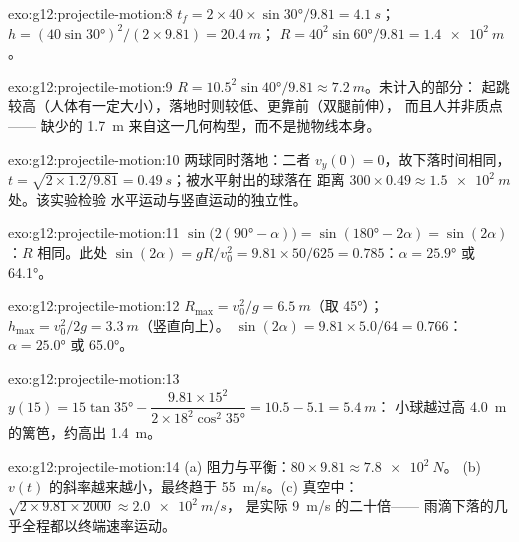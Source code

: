 \begin{solution}{exo:g12:projectile-motion:8}
$t_f = 2 \times 40 \times \sin\ang{30}/9.81 = \qty{4.1}{s}$；
$h = (40\sin\ang{30})^2/(2 \times 9.81) = \qty{20.4}{m}$；
$R = 40^2 \sin\ang{60}/9.81 = \qty{1.4e2}{m}$。
\end{solution}

\begin{solution}{exo:g12:projectile-motion:9}
$R = 10.5^2\sin\ang{40}/9.81 \approx \qty{7.2}{m}$。未计入的部分：
起跳较高（人体有一定大小），落地时则较低、更靠前（双腿前伸），
而且人并非质点——
缺少的 \qty{1.7}{m} 来自这一几何构型，而不是抛物线本身。
\end{solution}

\begin{solution}{exo:g12:projectile-motion:10}
两球同时落地：二者 $v_y(0) = 0$，故下落时间相同，
$t = \sqrt{2 \times 1.2/9.81} = \qty{0.49}{s}$；被水平射出的球落在
距离 $300 \times 0.49 \approx \qty{1.5e2}{m}$ 处。该实验检验
水平运动与竖直运动的独立性。
\end{solution}

\begin{solution}{exo:g12:projectile-motion:11}
$\sin\bigl(2(\ang{90}-\alpha)\bigr) = \sin(\ang{180}-2\alpha) =
\sin(2\alpha)$：$R$ 相同。此处 $\sin(2\alpha) = gR/v_0^2 =
9.81 \times 50/625 = 0.785$：$\alpha = \ang{25.9}$ 或 \ang{64.1}。
\end{solution}

\begin{solution}{exo:g12:projectile-motion:12}
$R_{\max} = v_0^2/g = \qty{6.5}{m}$（取 \ang{45}）；
$h_{\max} = v_0^2/2g = \qty{3.3}{m}$（竖直向上）。
$\sin(2\alpha) = 9.81 \times 5.0/64 = 0.766$：$\alpha = \ang{25.0}$
或 \ang{65.0}。
\end{solution}

\begin{solution}{exo:g12:projectile-motion:13}
$y(15) = 15\tan\ang{35} - \dfrac{9.81 \times 15^2}
{2 \times 18^2 \cos^2\ang{35}} = 10.5 - 5.1 = \qty{5.4}{m}$：
小球越过高 \qty{4.0}{m} 的篱笆，约高出 \qty{1.4}{m}。
\end{solution}

\begin{solution}{exo:g12:projectile-motion:14}
(a) 阻力与平衡：$80 \times 9.81 \approx \qty{7.8e2}{N}$。
(b) $v(t)$ 的斜率越来越小，最终趋于
\qty{55}{m/s}。(c) 真空中：
$\sqrt{2 \times 9.81 \times 2000} \approx \qty{2.0e2}{m/s}$，
是实际 \qty{9}{m/s} 的二十倍——
雨滴下落的几乎全程都以终端速率运动。
\end{solution}

